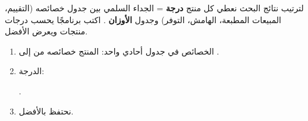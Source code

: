 \begin{statement}
لترتيب نتائج البحث نعطي كل منتج \textbf{درجة} = الجداء السلمي بين جدول خصائصه (التقييم، المبيعات المطبعة، الهامش، التوفر) وجدول \textbf{الأوزان} . اكتب برنامجًا يحسب درجات  منتجات ويعرض الأفضل.
\end{statement}
\begin{stepsbox}\begin{enumerate}
\item الخصائص في جدول أحادي واحد: المنتج  خصائصه من  إلى .
\item الدرجة: \par{\centering\small{}\par}.
\item نحتفظ بالأفضل.
\end{enumerate}\end{stepsbox}
